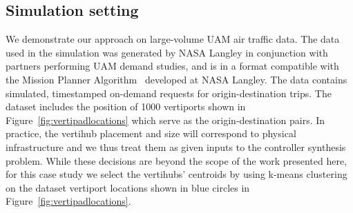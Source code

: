 

\subsection{Simulation setting}
We demonstrate our approach on large-volume UAM air traffic data. The data used in the simulation was generated by NASA Langley in conjunction with partners performing UAM demand studies, and is in a format compatible with the Mission Planner Algorithm~\cite{guerreiro2019mission} developed at NASA Langley. The data contains simulated, timestamped on-demand requests for origin-destination trips. The dataset includes the position of 1000 vertiports shown in Figure~\ref{fig:vertipadlocations} which serve as the origin-destination pairs. 
In practice, the vertihub placement and size will correspond to physical infrastructure and we thus treat them as given inputs to the controller synthesis problem. While these decisions are beyond the scope of the work presented here, for this case study we select the vertihubs' centroids by using k-means clustering on the dataset vertiport locations shown in blue circles in Figure~\ref{fig:vertipadlocations}.


